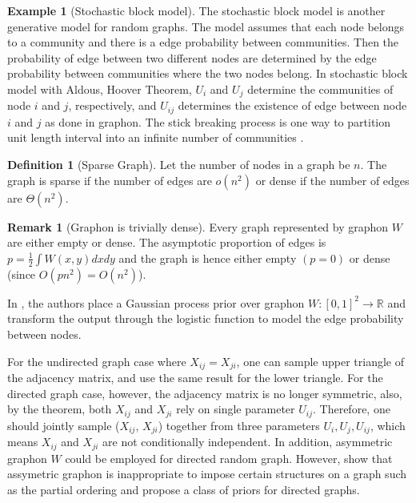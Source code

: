 \documentclass{article}
\theoremstyle{definition}
\newtheorem{definition}{Definition}
\newtheorem{example}{Example}[definition]
\newtheorem{remark}{Remark}
\begin{document}
\begin{example}[Stochastic block model] The stochastic block model is another generative model for random graphs. The model assumes that each node belongs to a community and there is a edge probability between communities. Then the probability of edge between two different nodes are determined by the edge probability between communities where the two nodes belong. In stochastic block model with Aldous, Hoover Theorem, $U_i$ and $U_j$ determine the communities of node $i$ and $j$, respectively, and $U_{ij}$ determines the existence of edge between node $i$ and $j$ as done in graphon. The stick breaking process is one way to partition unit length interval into an infinite number of communities \citep{sethuraman1994constructive}.
\end{example}

\begin{definition}[Sparse Graph]
Let the number of nodes in a graph be $n$. The graph is sparse if the number of edges are $o(n^2)$ or dense if the number of edges are $\Theta(n^2)$.
\end{definition}

\begin{remark}[Graphon is trivially dense]
Every graph represented by graphon $W$ are either empty or dense. The asymptotic proportion of edges is $p = \frac{1}{2}\int W(x, y) dxdy$ and the graph is hence either empty $(p=0)$ or dense (since $O(pn^2) = O(n^2)$).
\end{remark}

In \citep{Lloyd2013}, the authors place a Gaussian process prior over graphon $W:[0,1]^2 \rightarrow \mathbb{R}$ and transform the output through the logistic function to model the edge probability between nodes.

For the undirected graph case where $X_{ij} = X_{ji}$, one can sample upper triangle of the adjacency matrix, and use the same result for the lower triangle. For the directed graph case, however, the adjacency matrix is no longer symmetric, also, by the theorem, both $X_{ij}$ and $X_{ji}$ rely on single parameter $U_{ij}$. Therefore, one should jointly sample ($X_{ij}$, $X_{ji}$) together from three parameters $U_{i}, U_{j}, U_{ij}$, which means $X_{ij}$ and $X_{ji}$ are not conditionally independent. In addition, asymmetric graphon $W$ could be employed for directed random graph. However, \citep{Cai2015} show that assymetric graphon is inappropriate to impose certain structures on a graph such as the partial ordering and propose a class of priors for directed graphs.
\end{document}
